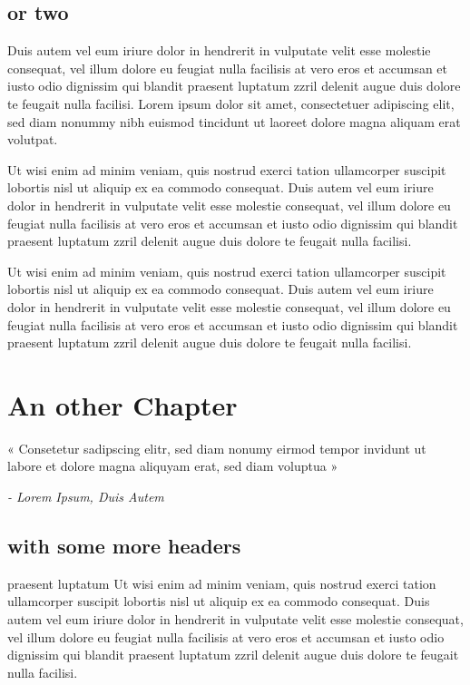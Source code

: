 \documentclass[10pt,twoside,twocolumn,openany,nodeprecatedcode]{dndbook}
\begin{document}
\section{or two} \label{sec:or_two}
Duis autem vel eum iriure dolor in hendrerit in vulputate velit esse molestie consequat, vel illum dolore eu feugiat nulla facilisis at vero eros et accumsan et iusto odio dignissim qui blandit praesent luptatum zzril delenit augue duis dolore te feugait nulla facilisi. Lorem ipsum dolor sit amet, consectetuer adipiscing elit, sed diam nonummy nibh euismod tincidunt ut laoreet dolore magna aliquam erat volutpat. 
\begin{DndReadAloud}{}
Ut wisi enim ad minim veniam, quis nostrud exerci tation ullamcorper suscipit lobortis nisl ut aliquip ex ea commodo consequat. Duis autem vel eum iriure dolor in hendrerit in vulputate velit esse molestie consequat, vel illum dolore eu feugiat nulla facilisis at vero eros et accumsan et iusto odio dignissim qui blandit praesent luptatum zzril delenit augue duis dolore te feugait nulla facilisi. 
\end{DndReadAloud}

\begin{DndComment}{}
Ut wisi enim ad minim veniam, quis nostrud exerci tation ullamcorper suscipit lobortis nisl ut aliquip ex ea commodo consequat. Duis autem vel eum iriure dolor in hendrerit in vulputate velit esse molestie consequat, vel illum dolore eu feugiat nulla facilisis at vero eros et accumsan et iusto odio dignissim qui blandit praesent luptatum zzril delenit augue duis dolore te feugait nulla facilisi. 
\end{DndComment}

\chapter{An other Chapter} \label{sec:An_other_Chapter}
\begingroup
\DndSetThemeColor[DmgLavender]\begin{DndSidebar}{}
\Large \centering «
\large \centering Consetetur sadipscing elitr, sed diam nonumy eirmod tempor invidunt ut labore et dolore magna aliquyam erat, sed diam voluptua
\Large »
 
 \normalsize \raggedleft \textit{ - Lorem Ipsum, Duis Autem}
\end{DndSidebar}
\endgroup
\section{with some more headers} \label{sec:with_some_more_headers}
\begin{DndComment}{praesent luptatum}
Ut wisi enim ad minim veniam, quis nostrud exerci tation ullamcorper suscipit lobortis nisl ut aliquip ex ea commodo consequat. Duis autem vel eum iriure dolor in hendrerit in vulputate velit esse molestie consequat, vel illum dolore eu feugiat nulla facilisis at vero eros et accumsan et iusto odio dignissim qui blandit praesent luptatum zzril delenit augue duis dolore te feugait nulla facilisi. 
\end{DndComment}
\end{document}
